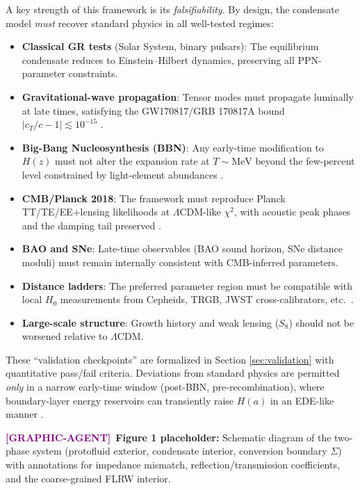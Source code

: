\documentclass[11pt,a4paper]{article}
\theoremstyle{definition}
\newcommand{\GRAPHAGENT}{\textcolor{purple}{\textbf{[GRAPHIC-AGENT]}}}
\begin{document}
A key strength of this framework is its \emph{falsifiability}. By design, the condensate model \emph{must} recover standard physics in all well-tested regimes:
\begin{itemize}[leftmargin=1.8em]
  \item \textbf{Classical GR tests} (Solar System, binary pulsars): The equilibrium condensate reduces to Einstein--Hilbert dynamics, preserving all PPN-parameter constraints.
  \item \textbf{Gravitational-wave propagation}: Tensor modes must propagate luminally at late times, satisfying the GW170817/GRB 170817A bound $|c_T/c - 1| \lesssim 10^{-15}$ \cite{GW170817}.
  \item \textbf{Big-Bang Nucleosynthesis (BBN)}: Any early-time modification to $H(z)$ must not alter the expansion rate at $T \sim \text{MeV}$ beyond the few-percent level constrained by light-element abundances \cite{BBN_Gbounds}.
  \item \textbf{CMB/Planck 2018}: The framework must reproduce Planck TT/TE/EE+lensing likelihoods at $\Lambda$CDM-like $\chi^2$, with acoustic peak phases and the damping tail preserved \cite{Planck2018}.
  \item \textbf{BAO and SNe}: Late-time observables (BAO sound horizon, SNe distance moduli) must remain internally consistent with CMB-inferred parameters.
  \item \textbf{Distance ladders}: The preferred parameter region must be compatible with local $H_0$ measurements from Cepheids, TRGB, JWST cross-calibrators, etc.\ \cite{RiessReview2024}.
  \item \textbf{Large-scale structure}: Growth history and weak lensing ($S_8$) should not be worsened relative to $\Lambda$CDM.
\end{itemize}

These ``validation checkpoints'' are formalized in Section \ref{sec:validation} with quantitative pass/fail criteria. Deviations from standard physics are permitted \emph{only} in a narrow early-time window (post-BBN, pre-recombination), where boundary-layer energy reservoirs can transiently raise $H(a)$ in an EDE-like manner \cite{EDEReview2023,PoulinReview2023}.

\GRAPHAGENT~\textbf{Figure 1 placeholder:} Schematic diagram of the two-phase system (protofluid exterior, condensate interior, conversion boundary $\Sigma$) with annotations for impedance mismatch, reflection/transmission coefficients, and the coarse-grained FLRW interior.
\end{document}
